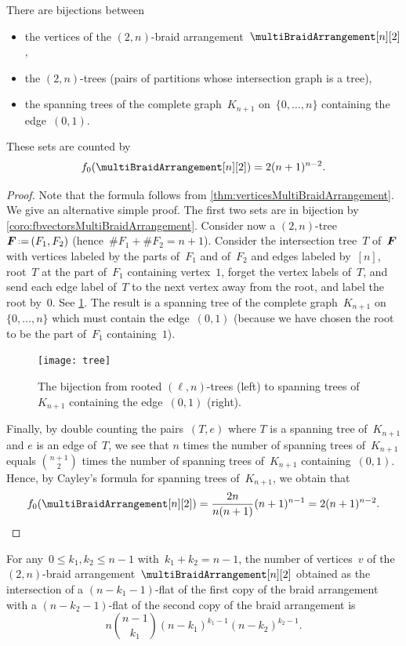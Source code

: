 \begin{theorem}
\label{thm:verticesDoubleBraidArrangement}
There are bijections between
\begin{itemize}
\item the vertices of the $(2,n)$-braid arrangement~$\multiBraidArrangement[n][2]$,
\item the $(2,n)$-trees (\ie pairs of partitions whose intersection graph is a tree),
\item the spanning trees of the complete graph~$K_{n+1}$ on~$\{0, \dots, n\}$ containing the edge~$(0,1)$.
\end{itemize}
These sets are counted by
\[
f_0(\multiBraidArrangement[n][2]) = 2 (n + 1)^{n-2}.
\]
\end{theorem}

\begin{proof}
Note that the formula follows from \cref{thm:verticesMultiBraidArrangement}.
We give an alternative simple proof.
The first two sets are in bijection by \cref{coro:fbvectorsMultiBraidArrangement}.
Consider now a $(2,n)$-tree~$\b{F} \eqdef (F_1,F_2)$ (hence~$\# F_1 + \# F_2 = n + 1$).
Consider the intersection tree~$T$ of~$\boldsymbol{F}$ with vertices labeled by the parts of~$F_1$ and of~$F_2$ and edges labeled by~$[n]$, root~$T$ at the part of~$F_1$ containing vertex~$1$, forget the vertex labels of~$T$, and send each edge label of~$T$ to the next vertex away from the root, and label the root by~$0$.
See \cref{fig:tree}.
The result is a spanning tree of the complete graph~$K_{n+1}$ on~$\{0, \dots, n\}$ which must contain the edge~$(0,1)$ (because we have chosen the root to be the part of~$F_1$ containing~$1$).
%
\begin{figure}
	\centerline{\texttt{[image: tree]}}
	\caption{The bijection from rooted $(\ell,n)$-trees (left) to spanning trees of~$K_{n+1}$ containing the edge~$(0,1)$ (right).}
	\label{fig:tree}
\end{figure}
%
Finally, by double counting the pairs~$(T,e)$ where $T$ is a spanning tree of~$K_{n+1}$ and $e$ is an edge of~$T$, we see that $n$ times the number of spanning trees of~$K_{n+1}$ equals $\binom{n+1}{2}$ times the number of spanning trees of~$K_{n+1}$ containing~$(0,1)$.
Hence, by Cayley's formula for spanning trees of~$K_{n+1}$, we obtain that
\[
f_0(\multiBraidArrangement[n][2]) = \frac{2n}{n(n+1)} (n+1)^{n-1} = 2 (n + 1)^{n-2}.
\qedhere
\]
\end{proof}

\begin{theorem}
\label{thm:verticesRefinedDoubleBraidArrangement}
For any~$0 \le k_1, k_2 \le n-1$ with~$k_1 + k_2 = n-1$, the number of vertices~$v$ of the $(2,n)$-braid arrangement~$\multiBraidArrangement[n][2]$ obtained as the intersection of a $(n-k_1-1)$-flat of the first copy of the braid arrangement with a $(n-k_2-1)$-flat of the second copy of the braid arrangement is
\[
n \binom{n-1}{k_1} (n-k_1)^{k_1-1} (n-k_2)^{k_2-1}.
\]
\end{theorem}

